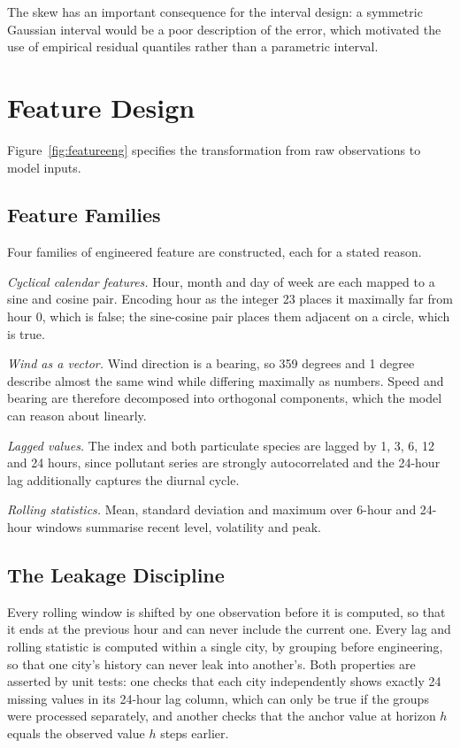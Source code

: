 
The skew has an important consequence for the interval design: a symmetric
Gaussian interval would be a poor description of the error, which motivated the
use of empirical residual quantiles rather than a parametric interval.

\section{Feature Design}
Figure~\ref{fig:featureeng} specifies the transformation from raw observations to
model inputs.


\subsection{Feature Families}
Four families of engineered feature are constructed, each for a stated reason.

\emph{Cyclical calendar features.} Hour, month and day of week are each mapped to
a sine and cosine pair. Encoding hour as the integer 23 places it maximally far
from hour 0, which is false; the sine-cosine pair places them adjacent on a
circle, which is true.

\emph{Wind as a vector.} Wind direction is a bearing, so 359 degrees and 1 degree
describe almost the same wind while differing maximally as numbers. Speed and
bearing are therefore decomposed into orthogonal components, which the model can
reason about linearly.

\emph{Lagged values.} The index and both particulate species are lagged by 1, 3,
6, 12 and 24 hours, since pollutant series are strongly autocorrelated and the
24-hour lag additionally captures the diurnal cycle.

\emph{Rolling statistics.} Mean, standard deviation and maximum over 6-hour and
24-hour windows summarise recent level, volatility and peak.

\subsection{The Leakage Discipline}
Every rolling window is shifted by one observation before it is computed, so that
it ends at the previous hour and can never include the current one. Every lag and
rolling statistic is computed within a single city, by grouping before
engineering, so that one city's history can never leak into another's. Both
properties are asserted by unit tests: one checks that each city independently
shows exactly 24 missing values in its 24-hour lag column, which can only be true
if the groups were processed separately, and another checks that the anchor value
at horizon $h$ equals the observed value $h$ steps earlier.

